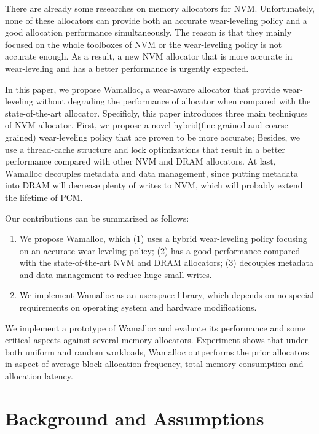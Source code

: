 \documentclass[10pt, conference, compsocconf]{IEEEtran}
\begin{document}
There are already some researches on memory allocators for NVM\cite{volos2011mnemosyne,coburn2011nv,moraru2013consistent}.
Unfortunately, none of these allocators can provide both an accurate wear-leveling policy
and a good allocation performance simultaneously.
The reason is that they mainly focused on the whole toolboxes of NVM or the wear-leveling policy is not accurate enough.
As a result, a new NVM allocator that is more accurate in wear-leveling and has a better performance is urgently expected.

In this paper, we propose Wamalloc, 
a wear-aware allocator that provide wear-leveling without degrading the performance of allocator 
when compared with the state-of-the-art allocator. 
Specificly, this paper introduces three main techniques of NVM allocator.
First, we propose a novel hybrid(fine-grained and coarse-grained) wear-leveling policy that are proven to be more accurate;
Besides, we use a thread-cache structure and lock optimizations that result in a better performance 
compared with other NVM and DRAM allocators.
At last, Wamalloc decouples metadata and data management,
since putting metadata into DRAM will decrease plenty of writes to NVM, which will probably extend the lifetime of PCM.

Our contributions can be summarized as follows:
\begin{enumerate}
    \item We propose Wamalloc, which
        (1) uses a hybrid wear-leveling policy focusing on an accurate wear-leveling policy;
        (2) has a good performance compared with the state-of-the-art NVM and DRAM allocators;
        (3) decouples metadata and data management to reduce huge small writes.
    \item We implement Wamalloc as an userspace library, which depends on no special requirements on operating system and hardware modifications.
\end{enumerate}

We implement a prototype of Wamalloc and 
evaluate its performance and some critical aspects against several memory allocators.
Experiment shows that under both uniform and random workloads, 
Wamalloc outperforms the prior allocators in aspect of average block allocation frequency, total memory consumption and allocation latency.


\section{Background and Assumptions}
\end{document}
